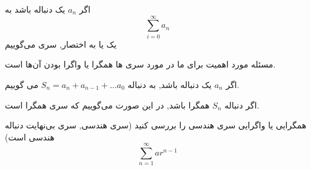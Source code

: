 
\begin{DEFINITION}
    اگر 
    $a_n$
    یک دنباله باشد به
    \[\sum_{i=0}^{\infty}a_n\]
    یک 
    یا به اختصار, سری می‌گوییم
\end{DEFINITION}
مسئله مورد اهمیت برای ما در مورد سری ها همگرا یا واگرا بودن آن‌ها است.
\begin{DEFINITION}
    اگر
    $a_n$
    یک دنباله باشد,
    به دنباله
    $S_n=a_n+a_{n-1}+...a_0$
    می گوییم.
\end{DEFINITION}


\begin{THEOREM}
    اگر دنباله 
    $S_n$
    همگرا باشد, در این صورت می‌گوییم که سری همگرا است.
\end{THEOREM}

\begin{PROBLEM}
    همگرایی یا واگرایی سری هندسی را بررسی کنید
    (سری هندسی, سری بی‌نهایت دنباله هندسی است)
    \[\sum_{n=1}^{\infty}ar^{n-1}\]
\end{PROBLEM}


